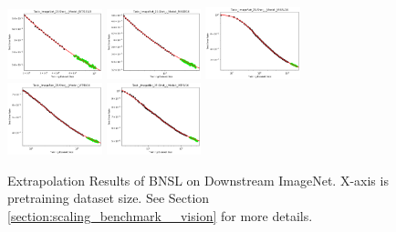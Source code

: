 \documentclass{article} %
\begin{document}
\begin{figure}[]
\includegraphics[width=0.245\textwidth]{figures/scaling_laws_benchmark_dataset_plots/few_shot_25___BiT_101_3.png}
\includegraphics[width=0.245\textwidth]{figures/scaling_laws_benchmark_dataset_plots/few_shot_25___MiX_B_16.png}
\includegraphics[width=0.245\textwidth]{figures/scaling_laws_benchmark_dataset_plots/few_shot_25___MiX_L_16.png}
\includegraphics[width=0.245\textwidth]{figures/scaling_laws_benchmark_dataset_plots/few_shot_25___ViT_B_16.png}
\includegraphics[width=0.245\textwidth]{figures/scaling_laws_benchmark_dataset_plots/few_shot_25___ViT_S_16.png}

    \caption{
    Extrapolation Results of BNSL on Downstream ImageNet. X-axis is pretraining dataset size. See Section \ref{section:scaling_benchmark__vision} for more details.
    }
    \label{fig:scaling_laws_benchmark_dataset__ImageNet}
\end{figure}

\clearpage

\iffalse
\end{document}
